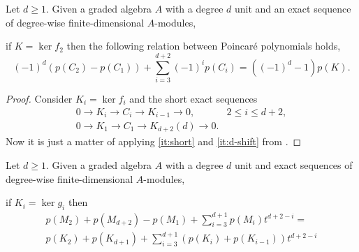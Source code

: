 \documentclass[a4paper]{amsart}
\begin{document}
\begin{proposition}
  \label{prop:circle_polynomial}
  Let $d\geq 1$. Given a graded algebra $A$ with a degree $d$ unit and an exact sequence of degree-wise finite-dimensional $A$-modules,
  \begin{center}
  \end{center}
  if $K=\ker f_2$ then the following relation between Poincaré polynomials holds,
  \[(-1)^d\left(p(C_2)-p(C_1)\right)+\sum_{i=3}^{d+2}(-1)^ip(C_i)=\left((-1)^d-1\right)p(K).\]
\end{proposition}

\begin{proof}
  Consider $K_i=\ker f_i$ and the short exact sequences
  \[\begin{array}{rr}
    0\to K_i\to C_i\to K_{i-1}\to 0,&2\leq i\leq d+2,\\
    0\to K_1\to C_1\to K_{d+2}(d)\to 0.
  \end{array}\]
  Now it is just a matter of applying \eqref{it:short} and \eqref{it:d-shift} from .
\end{proof}

\begin{proposition}
  \label{prop:poincare_consecutive}
  Let $d\geq 1$. Given a graded algebra $A$ with a degree $d$ unit and exact sequences of degree-wise finite-dimensional $A$-modules,
  \begin{center}
  \end{center}
  if $K_i=\ker g_i$ then
  \begin{multline*}
    p(M_2)+p(M_{d+2})-p(M_1)+\sum_{i=3}^{d+1}p(M_i)t^{d+2-i}=\\p(K_2)+p(K_{d+1})+\sum_{i=3}^{d+1}\left(p(K_i)+p(K_{i-1})\right)t^{d+2-i}
  \end{multline*}
\end{proposition}
\end{document}
